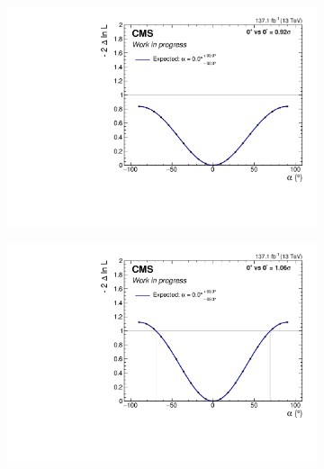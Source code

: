\begin{figure}[!ht]
    \begin{subfigure}[b]{0.5\linewidth}
        \centering
        \includegraphics[scale=0.35]{Chapitre7/Images/alpharun2dp.pdf} 
        \caption{} 
        \vspace{0.5ex}
    \end{subfigure}
    \begin{subfigure}[b]{0.5\linewidth}
        \centering
        \includegraphics[scale=0.35]{Chapitre7/Images/alpharun2pv.pdf} 
        \caption{} 
        \vspace{0.5ex}
    \end{subfigure}
    \caption{}
    \label{expectedscan}
\end{figure}

